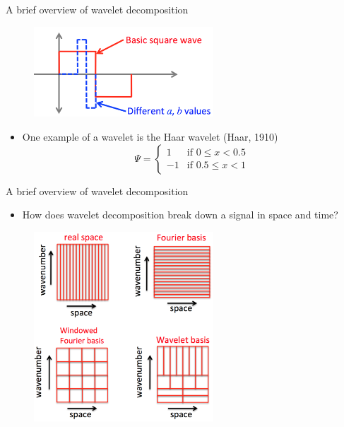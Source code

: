 \begin{frame}{A brief overview of wavelet decomposition}

\begin{figure}
	\includegraphics[width=0.6\textwidth]{wavelet2}
\end{figure}

\begin{itemize}
	\item One example of a wavelet is the Haar wavelet (Haar, 1910)
	$$\Psi = \begin{cases} 1 &\mbox{if } 0 \leq x < 0.5 \\ -1 & \mbox{if  } 0.5 \leq x < 1
	\end{cases}$$
\end{itemize}

\end{frame}


\begin{frame}{A brief overview of wavelet decomposition}


\begin{itemize}
	\item How does wavelet decomposition break down a signal in space and time?
\end{itemize}
\begin{figure}
	\includegraphics[width=0.6\textwidth]{wavelet3}
\end{figure}

\end{frame}

